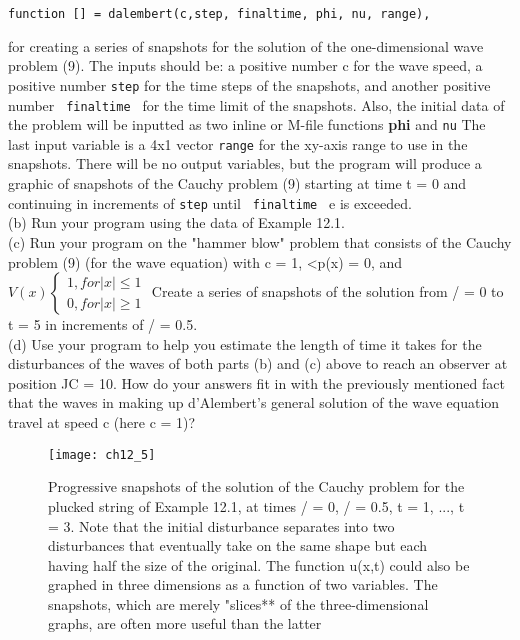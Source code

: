 \documentclass[../main.tex]{subfiles}
\begin{document}
\begin{verbatim}
function [] = dalembert(c,step, finaltime, phi, nu, range),  
\end{verbatim}
for creating a series of snapshots for the solution of the one-dimensional wave
problem (9). The inputs should be: a positive number c for the wave speed, a
positive number \texttt{step}  for the time steps of the snapshots, and another positive
number \texttt{ finaltime } for the time limit of the snapshots. Also, the initial data of
the problem will be inputted as two inline or M-file functions \textbf{phi} and \texttt{nu} The
last input variable is a 4x1 vector \texttt{range} for the xy-axis range to use in the
snapshots. There will be no output variables, but the program will produce a
graphic of snapshots of the Cauchy problem (9) starting at time t = 0 and
continuing in increments of \texttt{step} until \texttt{ finaltime } e is exceeded.\\
(b) Run your program using the data of Example 12.1.\\
(c) Run your program on the "hammer blow" problem that consists of the Cauchy
problem (9) (for the wave equation) with c = 1, <p(x) = 0, and
$V(x)
\begin{cases} 
1, for \vert x \vert \leqslant 1\\
0, for  \vert x\vert\geqslant 1
\end{cases}$
Create a series of snapshots of the solution from / = 0 to t = 5 in increments of / = 0.5.\\
(d) Use your program to help you estimate the length of time it takes for the
disturbances of the waves of both parts (b) and (c) above to reach an observer at
\newpage
position JC = 10. How do your answers fit in with the previously mentioned fact
that the waves in making up d'Alembert's general solution of the wave equation
travel at speed c (here c = 1)? 
\begin{figure}[H]
	\centering
	\texttt{[image: ch12\_5]}
	\caption{\textsf{ Progressive snapshots of the solution of the Cauchy problem for the
plucked string of Example 12.1, at times / = 0, / = 0.5, t = 1, ..., t = 3. Note that the initial
disturbance separates into two disturbances that eventually take on the same shape but each
having half the size of the original. The function u(x,t) could also be graphed in three
dimensions as a function of two variables. The snapshots, which are merely "slices** of the
three-dimensional graphs, are often more useful than the latter}}
	\label{pfig:ch12_5}
\end{figure}
\end{document}
